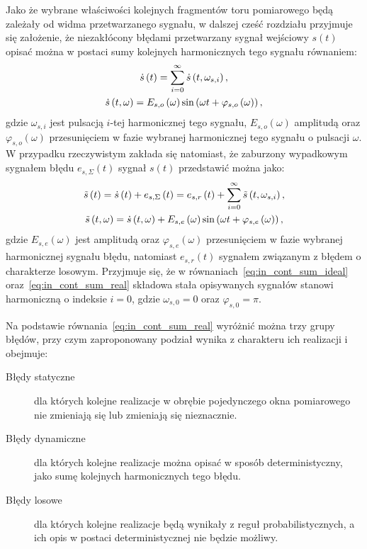 Jako że wybrane właściwości kolejnych fragmentów toru pomiarowego będą zależały od widma przetwarzanego sygnału, w dalszej cześć rozdziału przyjmuje się założenie, że niezakłócony błędami przetwarzany sygnał wejściowy $s(t)$ opisać można w postaci sumy kolejnych harmonicznych tego sygnału równaniem:
\begin{gather}
\dot{s} \left(t\right) = \sum _{i = 0} ^{\infty} \dot{s} \left( t, \omega_{s,i} \right) \label{eq:in_cont_sum_ideal}, \\
\dot{s} \left( t, \omega \right) = E_{s,o} \left(\omega\right) \sin \left( \omega t + \varphi_{s,o} \left(\omega\right) \right) \label{eq:in_cont_omega_ideal},
\end{gather}
gdzie $\omega_{s,i}$ jest pulsacją $i$-tej harmonicznej tego sygnału, $E_{s,o}(\omega)$ amplitudą oraz $\varphi_{s,o}(\omega)$ przesunięciem w fazie wybranej harmonicznej tego sygnału o pulsacji $\omega$. W przypadku rzeczywistym zakłada się natomiast, że zaburzony wypadkowym sygnałem błędu $e_{s,\Sigma}(t)$ sygnał $s(t)$ przedstawić można jako:
\begin{gather}
\tilde{s} \left(t\right) = \dot{s} \left(t\right) + e_{s,\Sigma} \left(t\right) = e_{s,r} \left(t\right) + \sum _{i = 0} ^{\infty} \tilde{s} \left( t, \omega_{s,i} \right) \label{eq:in_cont_sum_real}, \\
\tilde{s} \left( t, \omega \right) = \dot{s} \left( t, \omega \right) + E_{s,e} \left(\omega\right) \sin \left( \omega t + \varphi_{s,e} \left(\omega\right) \right) \label{eq:in_cont_omega_real},
\end{gather}
gdzie $E_{s,e}(\omega)$ jest amplitudą oraz $ \varphi_{s,e}(\omega)$ przesunięciem w fazie wybranej harmonicznej sygnału błędu, natomiast $e_{s,r}(t)$ sygnałem związanym z błędem o charakterze losowym. Przyjmuje się, że w równaniach~\eqref{eq:in_cont_sum_ideal} oraz~\eqref{eq:in_cont_sum_real} składowa stała opisywanych sygnałów stanowi harmoniczną o indeksie $i = 0$, gdzie $\omega_{s,0} = 0$ oraz $\varphi_{s,0} = \pi$.

Na podstawie równania~\eqref{eq:in_cont_sum_real} wyróżnić można trzy grupy błędów, przy czym zaproponowany podział wynika z charakteru ich realizacji i obejmuje:
\begin{description}
\item [Błędy statyczne] dla których kolejne realizacje w obrębie pojedynczego okna pomiarowego nie zmieniają się lub zmieniają się nieznacznie.
\item [Błędy dynamiczne] dla których kolejne realizacje można opisać w sposób deterministyczny, jako sumę kolejnych harmonicznych tego błędu.
\item [Błędy losowe] dla których kolejne realizacje będą wynikały z reguł probabilistycznych, a ich opis w postaci deterministycznej nie będzie możliwy.
\end{description}

